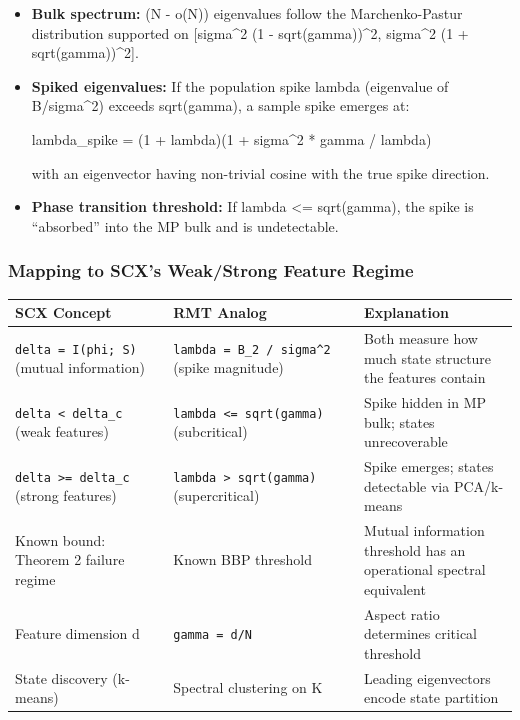 \documentclass[
  12pt,
]{article}
\begin{document}
\begin{itemize}
\item
  \textbf{Bulk spectrum:} (N - o(N)) eigenvalues follow the
  Marchenko-Pastur distribution supported on {[}sigma\^{}2 (1 -
  sqrt(gamma))\^{}2, sigma\^{}2 (1 + sqrt(gamma))\^{}2{]}.
\item
  \textbf{Spiked eigenvalues:} If the population spike lambda
  (eigenvalue of B/sigma\^{}2) exceeds sqrt(gamma), a sample spike
  emerges at:

  lambda\_spike = (1 + lambda)(1 + sigma\^{}2 * gamma / lambda)

  with an eigenvector having non-trivial cosine with the true spike
  direction.
\item
  \textbf{Phase transition threshold:} If lambda \textless= sqrt(gamma),
  the spike is ``absorbed'' into the MP bulk and is undetectable.
\end{itemize}

\subsubsection{Mapping to SCX's Weak/Strong Feature
Regime}\label{mapping-to-scxs-weakstrong-feature-regime}

\begin{longtable}[]{@{}
  >{\raggedright\arraybackslash}p{}
  >{\raggedright\arraybackslash}p{}
  >{\raggedright\arraybackslash}p{}@{}}
\toprule\noalign{}
\begin{minipage}[b]{\linewidth}\raggedright
SCX Concept
\end{minipage} & \begin{minipage}[b]{\linewidth}\raggedright
RMT Analog
\end{minipage} & \begin{minipage}[b]{\linewidth}\raggedright
Explanation
\end{minipage} \\
\midrule\noalign{}
\endhead
\bottomrule\noalign{}
\endlastfoot
\texttt{delta\ =\ I(phi;\ S)} (mutual information) &
\texttt{lambda\ =\ \textbar{}\textbar{}B\textbar{}\textbar{}\_2\ /\ sigma\^{}2}
(spike magnitude) & Both measure how much state structure the features
contain \\
\texttt{delta\ \textless{}\ delta\_c} (weak features) &
\texttt{lambda\ \textless{}=\ sqrt(gamma)} (subcritical) & Spike hidden
in MP bulk; states unrecoverable \\
\texttt{delta\ \textgreater{}=\ delta\_c} (strong features) &
\texttt{lambda\ \textgreater{}\ sqrt(gamma)} (supercritical) & Spike
emerges; states detectable via PCA/k-means \\
Known bound: Theorem 2 failure regime & Known BBP threshold & Mutual
information threshold has an operational spectral equivalent \\
Feature dimension d & \texttt{gamma\ =\ d/N} & Aspect ratio determines
critical threshold \\
State discovery (k-means) & Spectral clustering on K & Leading
eigenvectors encode state partition \\
\end{longtable}
\end{document}
